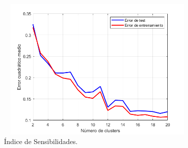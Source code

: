 \documentclass[12pt]{article}
\begin{document}
\begin{itemize}
\begin{figure}[h!]
\centering
\includegraphics[width=10cm,height=7cm]{imag/P1reglas12}
\caption{Índice de Sensibilidades.}
\label{f_P1reglas11}
\end{figure}


\end{itemize}
\end{document}
